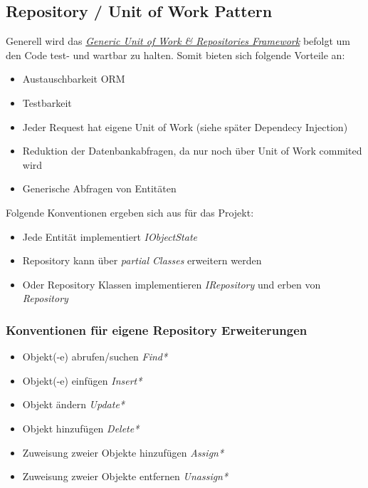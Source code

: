 	\subsection{Repository / Unit of Work Pattern}
	Generell wird das \href{https://genericunitofworkandrepositories.codeplex.com/}{\textit{Generic Unit of Work \& Repositories Framework}} befolgt um den Code test- und wartbar zu halten. Somit bieten sich folgende Vorteile an:
	\\\begin{itemize}	
		\item Austauschbarkeit ORM
		\item Testbarkeit
		\item Jeder Request hat eigene Unit of Work (siehe später Dependecy Injection)
		\item Reduktion der Datenbankabfragen, da nur noch über Unit of Work commited wird
		\item Generische Abfragen von Entitäten
	\end{itemize}
	Folgende Konventionen ergeben sich aus für das Projekt:
	\\\begin{itemize}
		\item Jede Entität implementiert \textit{IObjectState}
		\item Repository kann über \textit{partial Classes} erweitern werden
		\item Oder Repository Klassen implementieren \textit{IRepository} und erben von \textit{Repository}
	\end{itemize}

	\subsubsection{Konventionen für eigene Repository Erweiterungen}
	\begin{itemize}
		\item Objekt(-e) abrufen/suchen \textit{Find*}
		\item Objekt(-e) einfügen \textit{Insert*}
		\item Objekt ändern \textit{Update*}
		\item Objekt hinzufügen \textit{Delete*}
		\item Zuweisung zweier Objekte hinzufügen \textit{Assign*}
		\item Zuweisung zweier Objekte entfernen \textit{Unassign*}
	\end{itemize}

